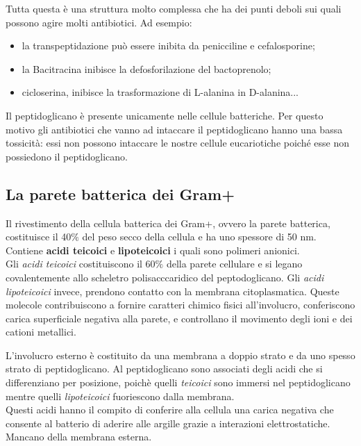 \documentclass[11pt]{book}
\begin{document}
\vspace{1em}
Tutta questa è una struttura molto complessa che ha dei punti deboli sui quali possono agire molti antibiotici. Ad esempio:
\begin{itemize}
\item la transpeptidazione può essere inibita da penicciline e cefalosporine;
\item la Bacitracina inibisce la defosforilazione del bactoprenolo;
\item cicloserina, inibisce la trasformazione di L-alanina in D-alanina...
\end{itemize}

Il peptidoglicano è presente unicamente nelle cellule batteriche. Per questo motivo gli antibiotici che vanno ad intaccare il peptidoglicano hanno una bassa tossicità: essi non possono intaccare le nostre cellule eucariotiche poiché esse non possiedono il peptidoglicano.

\subsection{La parete batterica dei Gram+}

Il rivestimento della cellula batterica dei Gram+, ovvero la parete batterica, costituisce il 40$\%$ del peso secco della cellula e ha uno spessore di 50 nm.\\
Contiene \textbf{acidi teicoici} e \textbf{lipoteicoici} i quali sono polimeri anionici.\\
Gli \emph{acidi teicoici} costituiscono il 60$\%$ della parete cellulare e si legano covalentemente allo scheletro polisacccaridico del peptodoglicano. Gli \emph{acidi lipoteicoici} invece, prendono contatto con la membrana citoplasmatica.
Queste molecole contribuiscono a fornire caratteri chimico fisici all’involucro, conferiscono carica superficiale negativa alla parete, e controllano il movimento degli ioni e dei cationi metallici.

\vspace{1em}
L'involucro esterno è costituito da una membrana a doppio strato e da uno spesso strato di peptidoglicano. Al peptidoglicano sono associati degli acidi che si differenziano per posizione, poichè quelli \emph{teicoici} sono immersi nel peptidoglicano mentre quelli \emph{lipoteicoici} fuoriescono dalla membrana. \\
Questi acidi hanno il compito di conferire alla cellula una carica negativa che consente al batterio di aderire alle argille grazie a interazioni elettrostatiche.\\
Mancano della membrana esterna.
\end{document}
